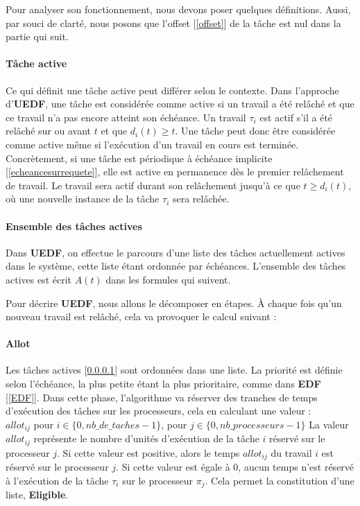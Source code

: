 	Pour analyser son fonctionnement, nous devons poser quelques définitions. Aussi, par souci de clarté, nous posons que 
	l'offset [\ref*{offset}] de la tâche est nul dans la partie qui suit.\\
	\paragraph{Tâche active}\label{tacheactive}
	Ce qui définit une tâche \og{}active\fg{} peut différer selon le contexte. Dans l'approche d'\textbf{UEDF}, une tâche est 
	considérée comme active si un travail a été relâché et que ce travail n'a pas encore atteint son échéance. 
	Un travail $\tau_i$ est actif s'il a été relâché sur ou avant $t$ et que $d_i(t) \geq t$.
	Une tâche peut donc 
	être considérée comme active même si l'exécution d'un travail en cours est terminée. 
	Concrètement, si une tâche est périodique à échéance implicite [\ref*{echeancesurrequete}], elle est active en permanence dès le 
	premier relâchement de travail. Le travail sera actif durant son relâchement jusqu'à ce que $t \geq d_i(t)$, où 
	une nouvelle instance de la tâche $\tau_i$ sera relâchée.
	
	
	\paragraph{Ensemble des tâches actives}\label{ensembledestachesactives}
	Dans \textbf{UEDF}, on effectue le parcours d'une liste des tâches actuellement actives dans le système, 
	cette liste étant ordonnée par échéances. 
	 L'ensemble des tâches actives est écrit $A(t)$ dans les formules qui suivent.\newline
	
	Pour décrire \textbf{UEDF}, nous allons le décomposer en étapes.
	À chaque fois qu'un nouveau travail est relâché, cela va provoquer le calcul suivant :\newline
	\paragraph{Allot}
	Les tâches actives [\ref*{tacheactive}] sont ordonnées dans une liste. La priorité est définie selon l'échéance, 
	la plus petite étant la plus prioritaire, comme dans \textbf{EDF} [\ref*{EDF}].
	Dans cette phase, l'algorithme va \og{}réserver\fg{} des tranches de temps d'exécution des tâches sur les 
	processeurs, cela en calculant une valeur : \\
	$allot_{ij}$ pour $i \in \{0, nb\_de\_taches - 1\}$, pour $j \in \{0, nb\_processeurs - 1\}$
	La valeur $allot_{ij}$ représente le nombre d'unités d'exécution de la tâche $i$ réservé sur le processeur $j$.\newline
	Si cette valeur est positive, alors le temps $allot_{ij}$ du travail $i$ est réservé sur le 
	processeur $j$. Si cette valeur est égale à $0$, aucun temps n'est réservé 
	à l'exécution de la tâche $\tau_i$ sur le processeur $\pi_j$. Cela permet la constitution d'une liste, 
	\textbf{Eligible}.\newline
	
